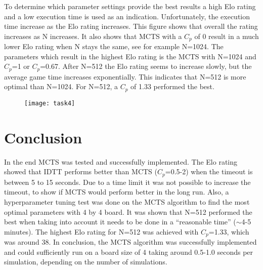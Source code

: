 \documentclass{article}
\begin{document}
To determine which parameter settings provide the best results a high Elo rating and a low execution time is used as an indication. Unfortunately, the execution time increase as the Elo rating increases. This figure shows that overall the rating increases as N increases. It also shows that MCTS with a $C_p$ of 0 result in a much lower Elo rating when N stays the same, see for example N=1024. The parameters which result in the highest Elo rating is the MCTS with N=1024 and $C_p$=1 or $C_p$=0.67. After N=512 the Elo rating seems to increase slowly, but the average game time increases exponentially. This indicates that N=512 is more optimal than N=1024. For N=512, a $C_p$ of 1.33 performed the best.

\begin{figure}[H]
\centering
\texttt{[image: task4]}
\label{fig:task4}
\end{figure}

\section{Conclusion}
In the end MCTS was tested and successfully implemented. The Elo rating showed that IDTT performs better than MCTS ($C_p$=0.5-2) when the timeout is between 5 to 15 seconds. Due to a time limit it was not possible to increase the timeout, to show if MCTS would perform better in the long run. Also, a hyperparameter tuning test was done on the MCTS algorithm to find the most optimal parameters with 4 by 4 board. It was shown that N=512 performed the best when taking into account it needs to be done in a ``reasonable time'' ($\sim$4-5 minutes). The highest Elo rating for N=512 was achieved with $C_p$=1.33, which was around 38. In conclusion, the MCTS algorithm was successfully implemented and could sufficiently run on a board size of 4 taking around 0.5-1.0 seconds per simulation, depending on the number of simulations.

\printbibliography
\end{document}
